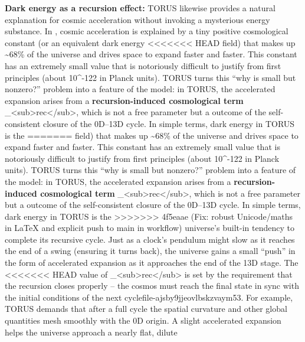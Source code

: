 \documentclass[]{article}
\begin{document}
\textbf{Dark energy as a recursion effect:} TORUS likewise provides a
natural explanation for cosmic acceleration without invoking a
mysterious energy substance. In , cosmic acceleration is explained
by a tiny positive cosmological constant \Lambda (or an equivalent dark energy
<<<<<<< HEAD
field) that makes up \textasciitilde68\% of the universe and drives
space to expand faster and faster. This constant \Lambda has an extremely
small value that is notoriously difficult to justify from first
principles (about 10\^{}-122 in Planck units)\hspace{0pt}. TORUS turns
this ``why is \Lambda small but nonzero?'' problem into a feature of the
model: in TORUS, the accelerated expansion arises from a
\textbf{recursion-induced cosmological term}
\Lambda\_\textless sub\textgreater rec\textless/sub\textgreater, which is not
a free parameter but a outcome of the self-consistent closure of the
0D--13D cycle\hspace{0pt}. In simple terms, dark energy in TORUS is the
=======
field) that makes up \textasciitilde{}68\% of the universe and drives
space to expand faster and faster. This constant \Lambda has an extremely
small value that is notoriously difficult to justify from first
principles (about 10\^{}-122 in Planck units)​. TORUS turns this ``why
is \Lambda small but nonzero?'' problem into a feature of the model: in TORUS,
the accelerated expansion arises from a \textbf{recursion-induced
cosmological term}
\Lambda\_\textless{}sub\textgreater{}rec\textless{}/sub\textgreater{}, which
is not a free parameter but a outcome of the self-consistent closure of
the 0D--13D cycle​. In simple terms, dark energy in TORUS is the
>>>>>>> 4f5eaae (Fix: robust Unicode/maths in LaTeX and explicit push to main in workflow)
universe's built-in tendency to complete its recursive cycle. Just as a
clock's pendulum might slow as it reaches the end of a swing (ensuring
it turns back), the universe gains a small ``push'' in the form of
accelerated expansion as it approaches the end of the 13D stage. The
<<<<<<< HEAD
value of \Lambda\_\textless sub\textgreater rec\textless/sub\textgreater{} is
set by the requirement that the recursion closes properly -- the cosmos
must reach the final state in sync with the initial conditions of the
next cycle\hspace{0pt}file-ajsby9jjeovlbskzvaym53\hspace{0pt}. For
example, TORUS demands that after a full cycle the spatial curvature and
other global quantities mesh smoothly with the 0D origin. A slight
accelerated expansion helps the universe approach a nearly flat, dilute
\end{document}

